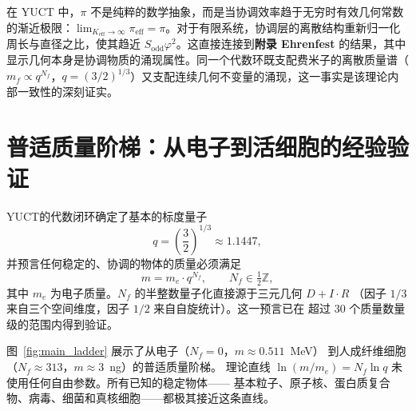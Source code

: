 \documentclass[11pt,a4paper]{article}
\begin{document}
	在 YUCT 中，$\pi$ 不是纯粹的数学抽象，而是当协调效率趋于无穷时有效几何常数的渐近极限：$\lim_{K_{\mathrm{eff}} \to \infty} \pi_{\mathrm{eff}} = \pi$。对于有限系统，协调层的离散结构重新归一化周长与直径之比，使其趋近 $S_{\mathrm{odd}}\varphi^2$。这直接连接到\textbf{附录 Ehrenfest} 的结果，其中显示几何本身是协调物质的涌现属性。同一个代数环既支配费米子的离散质量谱（$m_f \propto q^{N_f}$，$q = (3/2)^{1/3}$）又支配连续几何不变量的涌现，这一事实是该理论内部一致性的深刻证实。
	
\section{普适质量阶梯：从电子到活细胞的经验验证}
\label{sec:mass_ladder}

YUCT的代数闭环确定了基本的标度量子
\begin{equation}
	q = \left(\frac{3}{2}\right)^{1/3} \approx 1.1447,
\end{equation}
并预言任何稳定的、协调的物体的质量必须满足
\begin{equation}
	m = m_e \cdot q^{N_f}, \qquad N_f \in \tfrac{1}{2}\mathbb{Z},
\end{equation}
其中 $m_e$ 为电子质量。$N_f$ 的半整数量子化直接源于三元几何 $D+I\cdot R$
（因子 $1/3$ 来自三个空间维度，因子 $1/2$ 来自自旋统计）。这一预言已在
超过 30 个质量数量级的范围内得到验证。

图~\ref{fig:main_ladder} 展示了从电子（$N_f=0$，$m \approx 0.511$~MeV）
到人成纤维细胞（$N_f \approx 313$，$m \approx 3$~ng）的普适质量阶梯。
理论直线 $\ln(m/m_e) = N_f \ln q$ 未使用任何自由参数。所有已知的稳定物体——
基本粒子、原子核、蛋白质复合物、病毒、细菌和真核细胞——都极其接近这条直线。
\end{document}
